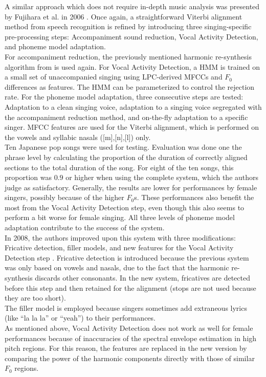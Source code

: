 A similar approach which does not require in-depth music analysis was presented by Fujihara et al. in 2006 \cite{fujihara_alignment}. Once again, a straightforward Viterbi alignment method from speech recognition is refined by introducing three singing-specific pre-processing steps: Accompaniment sound reduction, Vocal Activity Detection, and phoneme model adaptation.\\
For accompaniment reduction, the previously mentioned harmonic re-synthesis algorithm from \cite{fujihara_identification} is used again. For Vocal Activity Detection, a HMM is trained on a small set of unaccompanied singing using LPC-derived MFCCs and $F_0$ differences as features. The HMM can be parameterized to control the rejection rate. For the phoneme model adaptation, three consecutive steps are tested: Adaptation to a clean singing voice, adaptation to a singing voice segregated with the accompaniment reduction method, and on-the-fly adaptation to a specific singer. MFCC features are used for the Viterbi alignment, which is performed on the vowels and syllabic nasals ([m],[n],[l]) only.\\
Ten Japanese pop songs were used for testing. Evaluation was done one the phrase level by calculating the proportion of the duration of correctly aligned sections to the total duration of the song. For eight of the ten songs, this proportion was $0.9$ or higher when using the complete system, which the authors judge as satisfactory. Generally, the results are lower for performances by female singers, possibly because of the higher $F_0$s. These performances also benefit the most from the Vocal Activity Detection step, even though this also seems to perform a bit worse for female singing. All three levels of phoneme model adaptation contribute to the success of the system.\\
In 2008, the authors improved upon this system with three modifications: Fricative detection, filler models, and new features for the Vocal Activity Detection step \cite{fujihara}. Fricative detection is introduced because the previous system was only based on vowels and nasals, due to the fact that the harmonic re-synthesis discards other consonants. In the new system, fricatives are detected before this step and then retained for the alignment (stops are not used because they are too short).\\
The filler model is employed because singers sometimes add extraneous lyrics (like ``la la la'' or ``yeah'') to their performances.\\
As mentioned above, Vocal Activity Detection does not work as well for female performances because of inaccuracies of the spectral envelope estimation in high pitch regions. For this reason, the features are replaced in the new version by comparing the power of the harmonic components directly with those of similar $F_0$ regions.\\
